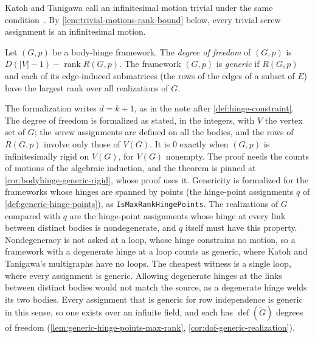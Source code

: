 Katoh and Tanigawa call an infinitesimal motion trivial under the same
condition~\cite[\S2.3]{katohTanigawa2011}. By
\cref{lem:trivial-motions-rank-bound} below, every trivial screw
assignment is an infinitesimal motion.

\begin{definition}
  \label{def:dof-generic}
  \leanok
  Let $(G,p)$ be a body-hinge framework. The \emph{degree of freedom}
  of $(G,p)$ is $D(|V|-1) - \operatorname{rank} R(G,p)$. The framework
  $(G,p)$ is \emph{generic} if $R(G,p)$ and each of its edge-induced
  submatrices (the rows of the edges of a subset of $E$) have the
  largest rank over all realizations of $G$.
\end{definition}

\begin{fmlnote}
  The formalization writes $d = k + 1$, as in the note after
  \cref{def:hinge-constraint}. The degree of freedom is formalized as
  stated, in the integers, with $V$ the vertex set of $G$; the screw
  assignments are defined on all the bodies, and the rows of
  $R(G,p)$ involve only those of $V(G)$. It is $0$ exactly when
  $(G,p)$ is infinitesimally rigid on $V(G)$, for $V(G)$ nonempty.
  The proof needs the counts of motions of the algebraic induction,
  and the theorem is pinned at \cref{cor:bodyhinge-generic-rigid},
  whose proof uses it. Genericity is formalized for the
  frameworks whose hinges are spanned by points (the hinge-point
  assignments $q$ of \cref{def:generic-hinge-points}), as
  \texttt{IsMaxRankHingePoints}. The realizations of $G$ compared with
  $q$ are the hinge-point assignments whose hinge at every link between
  distinct bodies is nondegenerate, and $q$ itself must have this
  property. Nondegeneracy is not asked at a loop, whose hinge
  constrains no motion, so a framework with a degenerate hinge at a
  loop counts as generic, where Katoh and Tanigawa's multigraphs have
  no loops. The cheapest witness is a single loop, where every
  assignment is generic. Allowing degenerate hinges at the links
  between distinct bodies would not match the source, as a degenerate
  hinge welds its two bodies. Every assignment that is generic for
  row independence is generic in this sense, so one exists over an
  infinite field, and each has $\operatorname{def}(\tilde G)$ degrees
  of freedom (\cref{lem:generic-hinge-points-max-rank},
  \cref{cor:dof-generic-realization}).
\end{fmlnote}

